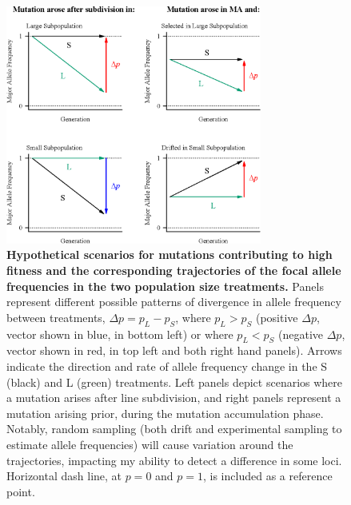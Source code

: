 \begin{figure}[!h]
    \centering
    \includegraphics[width=0.75\textwidth]{Chp4_DNA/2023_predict_DeltaP_predict.eps}
\caption[Hypothetical scenarios for mutations contributing to high fitness and the corresponding trajectories of the focal allele frequencies in the two population size treatments. ]{\textbf{Hypothetical scenarios for mutations contributing to high fitness and the corresponding trajectories of the focal allele frequencies in the two population size treatments.} Panels represent different possible patterns of divergence in allele frequency between treatments, $\Delta p = p_L-p_S$, where $p_L > p_S$ (positive $\Delta p$, vector shown in blue, in bottom left) or where $p_L < p_S$ (negative $\Delta p$, vector shown in red, in top left and both right hand panels). Arrows indicate the direction and rate of allele frequency change in the S (black) and L (green) treatments. Left panels depict scenarios where a mutation arises after line subdivision, and right panels represent a mutation arising prior, during the mutation accumulation phase. Notably, random sampling (both drift and experimental sampling to estimate allele frequencies) will cause variation around the trajectories, impacting my ability to detect a difference in some loci. Horizontal dash line, at $p = 0$ and $p = 1$, is included as a reference point. }
    \label{fig:FitScenario}
\end{figure}

\FloatBarrier

